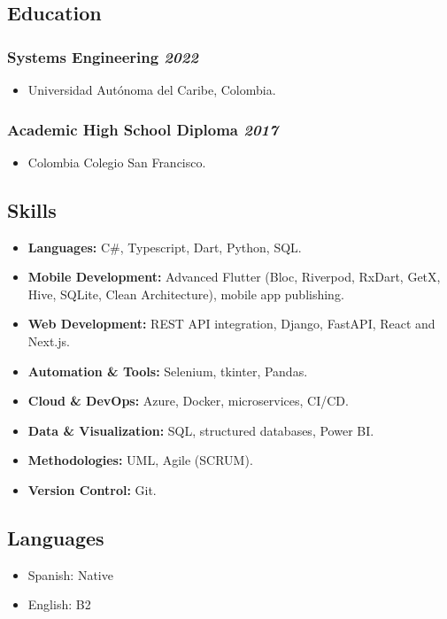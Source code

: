 \documentclass[a4paper,10pt]{article}
\begin{document}

\subsection*{Education}
\subsubsection*{\textbf{Systems Engineering} \hfill \textit{2022}}
\begin{itemize}
  \item Universidad Autónoma del Caribe, Colombia.
\end{itemize}

\subsubsection*{\textbf{Academic High School Diploma} \hfill \textit{2017}}
\begin{itemize}
  \item Colombia Colegio San Francisco.
\end{itemize}

\subsection*{Skills}
\begin{itemize}
  \item \textbf{Languages:} C\#, Typescript, Dart, Python, SQL.
  \item \textbf{Mobile Development:} Advanced Flutter (Bloc, Riverpod, RxDart, GetX, Hive, SQLite, Clean Architecture), mobile app publishing.
  \item \textbf{Web Development:} REST API integration, Django, FastAPI, React and Next.js.
  \item \textbf{Automation \& Tools:} Selenium, tkinter, Pandas.
  \item \textbf{Cloud \& DevOps:} Azure, Docker, microservices, CI/CD.
  \item \textbf{Data \& Visualization:} SQL, structured databases, Power BI.
  \item \textbf{Methodologies:} UML, Agile (SCRUM).
  \item \textbf{Version Control:} Git.
\end{itemize}

\subsection*{Languages}
\begin{itemize}
  \item Spanish: Native
  \item English: B2
\end{itemize}
\end{document}

